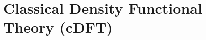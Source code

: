 \documentclass{beamer}
\begin{document}
            


\section*{Classical Density Functional Theory (cDFT)}
\end{document}
